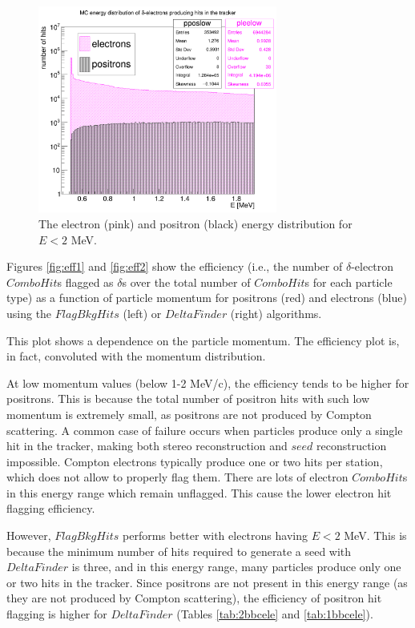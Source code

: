 \begin{figure}[!h]
    \centering
    \includegraphics[width =0.7\textwidth]{figures/png/Screenshot_20240820_154854.png}
    \caption[The electron and positron energy distribution for $E<2$ MeV.]{The electron (pink) and positron (black) 
    energy distribution for $E<2$ MeV.}
    \label{fig:detail}
\end{figure}

Figures \ref{fig:eff1} and \ref{fig:eff2} show the efficiency (i.e., the number of $\delta$-electron 
$ComboHit$s flagged as $\delta$s over the total number of $ComboHit$s 
for each particle type) as a function of particle momentum for positrons (red) 
and electrons (blue) using the $FlagBkgHits$ (left) or $DeltaFinder$ (right) algorithms. 

This plot shows a dependence on the particle momentum.
The efficiency plot is, in fact, convoluted with the momentum 
distribution. 

At low momentum values (below 1-2 MeV/c), the efficiency tends to be higher for positrons. 
This is because the total number of positron hits with 
such low momentum is extremely small, as positrons are not produced by  
Compton scattering. A common case of failure occurs when particles produce 
only a single hit in the tracker, making both stereo reconstruction and 
$seed$ reconstruction impossible. Compton electrons typically produce  
one or two hits per station, which does not allow to properly flag them. 
There are lots of electron $ComboHit$s in this energy range which remain 
unflagged. This cause the lower electron hit flagging efficiency.

However, $FlagBkgHits$ performs better with electrons having $E < 2$ MeV. 
This is because the minimum number of hits required to generate a 
seed with $DeltaFinder$ is three, and in this energy range, many 
particles produce only one or two hits in the tracker. Since positrons 
are not present in this energy range (as they are not produced by 
Compton scattering), the efficiency of positron hit flagging is 
higher for $DeltaFinder$ (Tables \ref{tab:2bbcele} and \ref{tab:1bbcele}).


